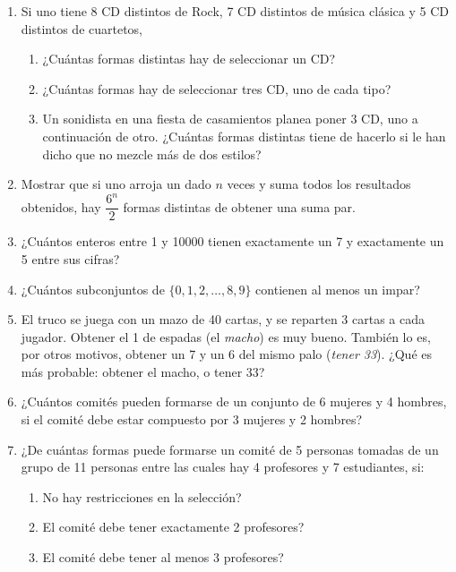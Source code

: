 \documentclass[a4paper,12pt,twoside,spanish,reqno]{amsbook}
\numberwithin{equation}{section}
\begin{document}
\begin {enumerate}
\item Si uno tiene 8 CD distintos de Rock, 7 CD distintos de música clásica y 5 CD distintos de cuartetos,
\begin{enumerate}
    \item ¿Cuántas formas distintas hay de seleccionar un CD?

    \item ¿Cuántas formas hay de seleccionar tres CD, uno de cada tipo?

    \item Un sonidista en una fiesta de casamientos planea poner 3 CD, uno a continuación de otro. ¿Cuántas formas distintas tiene de hacerlo si le han dicho que no mezcle más de dos estilos?
\end{enumerate}


\item Mostrar que si uno arroja un dado $n$ veces y suma todos los resultados obtenidos, hay $\dfrac{6^n}{2}$ formas distintas de obtener una suma par.


\item ¿Cuántos enteros entre 1 y 10000 tienen exactamente un 7 y exactamente un 5 entre sus cifras?


\item ¿Cuántos subconjuntos de $\{0,1,2,\dots,8,9\}$ contienen al menos un impar?


\item El truco se juega con un mazo de 40 cartas, y se reparten 3 cartas a cada jugador. Obtener el 1 de espadas (el {\it macho}) es muy bueno. También lo es, por otros motivos, obtener un 7 y un 6 del mismo palo ({\it tener 33}). ¿Qué es más probable: obtener el macho, o tener 33?


\item ¿Cuántos comités pueden formarse de un conjunto de 6 mujeres y 4 hombres, si el comité debe estar compuesto por 3 mujeres y 2 hombres?


\item ¿De cuántas formas puede formarse un comité de 5 personas tomadas de un grupo de 11 personas entre las cuales hay 4 profesores y 7 estudiantes, si:
\begin{enumerate}
    \item No hay restricciones en la selección?

    \item El comité debe tener exactamente 2 profesores?

    \item El comité debe tener al menos 3 profesores?


\end{enumerate}
\end{enumerate}
\end{document}
